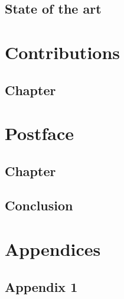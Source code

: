 \documentclass[crop]{style/umemoir} %
\begin{document}

\chapter{State of the art}
\label{chapter:state_of_the_art}
%


\part{Contributions}
\label{part:contribution}



\label{chapter:chapter}
\chapter{Chapter}



\part{Postface}
\label{part:postface}


\chapter{Chapter}
\label{chapter:chapter}
%


\chapter{Conclusion}
\label{chapter:conclusion}



\part{Appendices}
\label{part:appendices}

\begin{appendices}

\chapter{Appendix 1}

\end{appendices}
\end{document}

